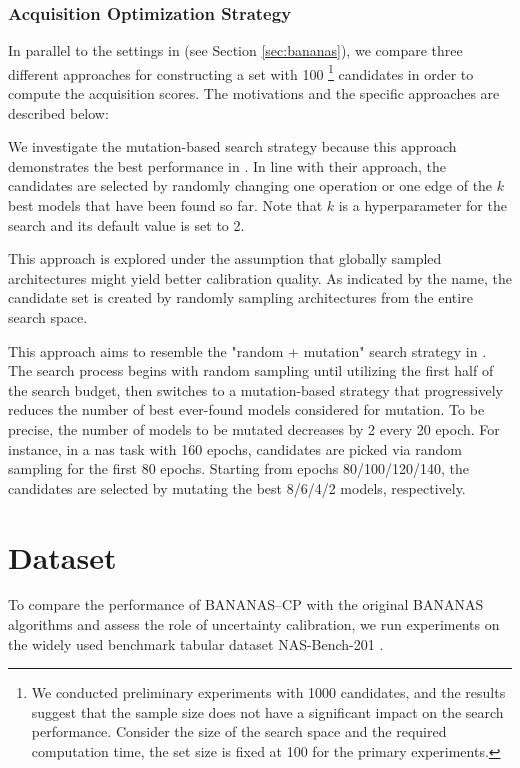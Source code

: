 \documentclass[a4paper,oneside,bibliography=totoc]{scrbook}
\begin{document}
\subsection{Acquisition Optimization Strategy}
In parallel to the settings in \cite{white2019bananas} (see Section \ref{sec:bananas}), we compare three different approaches for constructing a set with 100 \footnote{We conducted preliminary experiments with 1000 candidates, and the results suggest that the sample size does not have a significant impact on the search performance. Consider the size of the search space and the required computation time, the set size is fixed at 100 for the primary experiments.} candidates in order to compute the acquisition scores. The motivations and the  specific approaches are described below:
 
\begin{description}[leftmargin=0cm]
\item[Mutation] We investigate the mutation-based search strategy because this approach demonstrates the best performance in \cite{white2019bananas}. In line with their approach, the candidates are selected by randomly changing one operation or one edge of the $k$ best models that have been found so far. Note that $k$ is a hyperparameter for the search and its default value is set to 2. 
\item[Random Sampling] This approach is explored under the assumption that globally sampled architectures might yield better calibration quality. As indicated by the name, the candidate set is created by randomly sampling architectures from the entire search space.
\item[Dynamic] This approach aims to resemble the "random + mutation" search strategy in \cite{white2019bananas}. The search process begins with random sampling until utilizing the first half of the search budget, then switches to a mutation-based strategy that progressively reduces the number of best ever-found models considered for mutation. To be precise, the number of models to be mutated decreases by 2 every 20 epoch. For instance, in a \gls{nas} task with 160 epochs, candidates are picked via random sampling for the first 80 epochs. Starting from epochs 80/100/120/140, the candidates are selected by mutating the best 8/6/4/2 models, respectively.

\end{description} 

\chapter{Dataset}
\label{Dataset}
To compare the performance of BANANAS--CP with the original BANANAS algorithms and assess the role of uncertainty calibration, we run experiments on the widely used benchmark tabular dataset NAS-Bench-201 \cite{dong2020nasbench201}.
\end{document}
